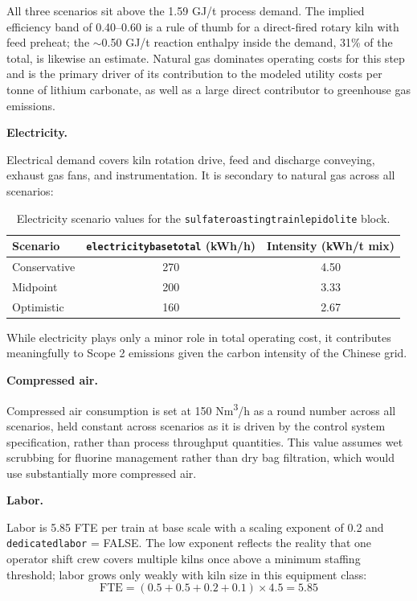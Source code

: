 \documentclass{article}
\renewcommand\_{\textunderscore\allowbreak}
\begin{document}
\noindent All three scenarios sit above the 1.59 GJ/t process demand. The implied efficiency band of 0.40--0.60 is a rule of thumb for a direct-fired rotary kiln with feed preheat; the $\sim$0.50 GJ/t reaction enthalpy inside the demand, 31\% of the total, is likewise an estimate. Natural gas dominates operating costs for this step and is the primary driver of its contribution to the modeled utility costs per tonne of lithium carbonate, as well as a large direct contributor to greenhouse gas emissions.

\medskip
\noindent\textbf{Electricity.}\quad

Electrical demand covers kiln rotation drive, feed and discharge conveying, exhaust gas fans, and instrumentation. It is secondary to natural gas across all scenarios:

\begin{table}[h!]
\caption{Electricity scenario values for the \texttt{sulfate\_roasting\_train\_lepidolite} block.}
\centering
\begin{tabular}{lcc}
\toprule
\textbf{Scenario} & \texttt{electricity\_base\_total} (kWh/h) & \textbf{Intensity (kWh/t mix)} \\
\midrule
Conservative & 270 & 4.50 \\
Midpoint     & 200 & 3.33 \\
Optimistic   & 160 & 2.67 \\
\bottomrule
\end{tabular}
\end{table}

\noindent While electricity plays only a minor role in total operating cost, it contributes meaningfully to Scope 2 emissions given the carbon intensity of the Chinese grid.

\medskip
\noindent\textbf{Compressed air.}\quad

Compressed air consumption is set at 150 \si{Nm^3/h} as a round number across all scenarios, held constant across scenarios as it is driven by the control system specification, rather than process throughput quantities. This value assumes wet scrubbing for fluorine management rather than dry bag filtration, which would use substantially more compressed air.

\medskip
\noindent\textbf{Labor.}\quad

Labor is 5.85 FTE per train at base scale with a scaling exponent of 0.2 and \texttt{dedicated\_labor} = FALSE. The low exponent reflects the reality that one operator shift crew covers multiple kilns once above a minimum staffing threshold; labor grows only weakly with kiln size in this equipment class:
\[
	\text{FTE} = (0.5 + 0.5 + 0.2 + 0.1) \times 4.5 = 5.85
\]
\end{document}
